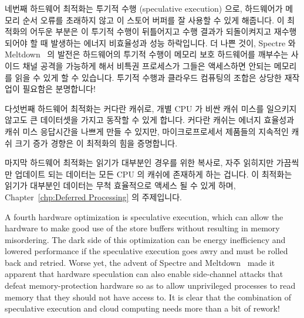 네번째 하드웨어 최적화는 투기적 수행 (speculative execution) 으로, 하드웨어가
메모리 순서 오류를 초래하지 않고 이 스토어 버퍼를 잘 사용할 수 있게 해줍니다.
이 최적화의 어두운 부분은 이 투기적 수행이 뒤틀어지고 수행 결과가 되돌이켜지고
재수행 되어야 할 때 발생하는 에너지 비효율성과 성능 하락입니다.
더 나쁜 것이, Spectre 와 Meltdown~\cite{JannHorn2018MeltdownSpectre} 의 발전은
하드웨어의 투기적 수행이 메모리 보호 하드웨어를 깨부수는 사이드 채널 공격을
가능하게 해서 비특권 프로세스가 그들은 액세스하면 안되는 메모리를 읽을 수 있게
할 수 있습니다.
투기적 수행과 클라우드 컴퓨팅의 조합은 상당한 재작업이 필요함은 분명합니다!

다섯번째 하드웨어 최적화는 커다란 캐쉬로, 개별 CPU 가 비싼 캐쉬 미스를 일으키지
않고도 큰 데이터셋을 가지고 동작할 수 있게 합니다.
커다란 캐쉬는 에너지 효율성과 캐쉬 미스 응답시간을 나쁘게 만들 수 있지만,
마이크로프로세서 제품들의 지속적인 캐쉬 크기 증가 경향은 이 최적화의 힘을
증명합니다.

마지막 하드웨어 최적화는 읽기가 대부분인 경우를 위한 복사로, 자주 읽히지만
가끔씩만 업데이트 되는 데이터는 모든 CPU 의 캐쉬에 존재하게 하는 겁니다.
이 최적화는 읽기가 대부분인 데이터는 무척 효율적으로 액세스 될 수 있게 하며,
Chapter~\ref{chp:Deferred Processing} 의 주제입니다.

\iffalse

A fourth hardware optimization is speculative execution, which can
allow the hardware to make good use of the store buffers without
resulting in memory misordering.
The dark side of this optimization can be energy inefficiency and
lowered performance if the speculative execution goes awry and must
be rolled back and retried.
Worse yet, the advent of
Spectre and Meltdown~\cite{JannHorn2018MeltdownSpectre}
made it apparent that hardware speculation can also enable side-channel
attacks that defeat memory-protection hardware so as to allow unprivileged
processes to read memory that they should not have access to.
It is clear that the combination of speculative execution and cloud
computing needs more than a bit of rework!

